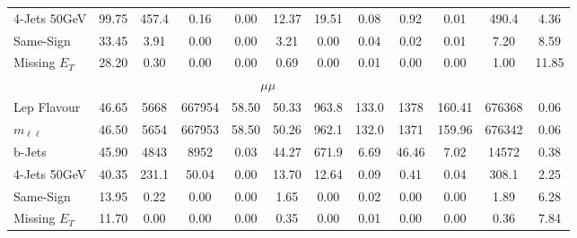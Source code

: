 \begin{table}[htb]
\begin{center}
{\begin{tabular}{l|c|   |ccc|ccc|cc|c||c}
           4-Jets 50GeV &  	   99.75 &  	   457.4 &  	   0.16 &  	   0.00 &  	   12.37 &  	   19.51 &  	   0.08 &  	   0.92 &  	   0.01 &  	   490.4 & 	 4.36 \\
           Same-Sign    &  	   33.45 &  	   3.91 &  	   0.00 &  	   0.00 &  	   3.21 &  	   0.00 &  	   0.04 &  	   0.02 &  	   0.01 &  	   7.20 & 	 8.59 \\
           Missing $E_{T}$ &  	   28.20 &  	   0.30 &  	   0.00 &  	   0.00 &  	   0.69 &  	   0.00 &  	   0.01 &  	   0.00 &  	   0.00 &  	   1.00 & 	 11.85 \\
           \hline\multicolumn{11}{c}{$\mu\mu$} \\ \hline
           Lep Flavour  &  	   46.65 &  	   5668 &  	   667954 &  	   58.50 &  	   50.33 &  	   963.8 &  	   133.0 &  	   1378 &  	   160.41 &  	   676368 & 	 0.06 \\
           $m_{\ell\ell}$ &  	   46.50 &  	   5654 &  	   667953 &  	   58.50 &  	   50.26 &  	   962.1 &  	   132.0 &  	   1371 &  	   159.96 &  	   676342 & 	 0.06 \\
           b-Jets       &  	   45.90 &  	   4843 &  	   8952 &  	   0.03 &  	   44.27 &  	   671.9 &  	   6.69 &  	   46.46 &  	   7.02 &  	   14572 & 	 0.38 \\
           4-Jets 50GeV &  	   40.35 &  	   231.1 &  	   50.04 &  	   0.00 &  	   13.70 &  	   12.64 &  	   0.09 &  	   0.41 &  	   0.04 &  	   308.1 & 	 2.25 \\
           Same-Sign    &  	   13.95 &  	   0.22 &  	   0.00 &  	   0.00 &  	   1.65 &  	   0.00 &  	   0.02 &  	   0.00 &  	   0.00 &  	   1.89 & 	 6.28 \\
           Missing $E_{T}$ &  	   11.70 &  	   0.00 &  	   0.00 &  	   0.00 &  	   0.35 &  	   0.00 &  	   0.01 &  	   0.00 &  	   0.00 &  	   0.36 & 	 7.84 \\
           \hline
        \end{tabular}}
\end{center}
\end{table}


